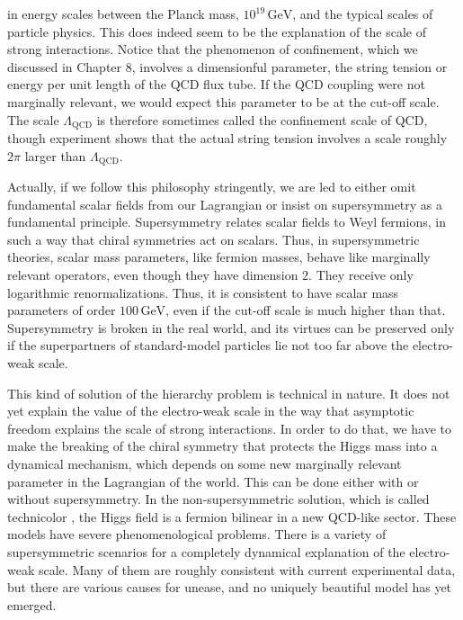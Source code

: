 in energy scales between the Planck mass, $10^{19}\,\mathrm{GeV}$, and the
typical scales of particle physics. This does indeed seem to be the explanation
of the scale of strong interactions. Notice that the phenomenon of confinement,
which we discussed in Chapter 8, involves a dimensionful parameter, the string
tension or energy per unit length of the QCD flux tube. If the QCD coupling
were not marginally relevant, we would expect this parameter to be at the
cut-off scale. The scale $\Lambda_{\mathrm{QCD}}$ is therefore sometimes called
the confinement scale of QCD, though experiment shows that the actual string
tension involves a scale roughly $2\pi$ larger than $\Lambda_{\mathrm{QCD}}$.

Actually, if we follow this philosophy stringently, we are led to either omit
fundamental scalar fields from our Lagrangian or insist on supersymmetry as a
fundamental principle. Supersymmetry relates scalar fields to Weyl fermions, in
such a way that chiral symmetries act on scalars. Thus, in supersymmetric
theories, scalar mass parameters, like fermion masses, behave like marginally
relevant operators, even though they have dimension $2$. They receive only
logarithmic renormalizations. Thus, it is consistent to have scalar mass
parameters of order $100\,\mathrm{GeV}$, even if the cut-off scale is much
higher than that. Supersymmetry is broken in the real world, and its virtues can
be preserved only if the superpartners of standard-model particles lie not too
far above the electro-weak scale.

This kind of solution of the hierarchy problem is technical in nature. It does
not yet explain the value of the electro-weak scale in the way that asymptotic
freedom explains the scale of strong interactions. In order to do that, we have
to make the breaking of the chiral symmetry that protects the Higgs mass into a
dynamical mechanism, which depends on some new marginally relevant parameter in
the Lagrangian of the world. This can be done either with or without
supersymmetry. In the non-supersymmetric solution, which is called technicolor
\cite{banks-ref-123}, the Higgs field is a fermion bilinear in a new QCD-like
sector. These models have severe phenomenological problems. There is a variety
of supersymmetric scenarios for a completely dynamical explanation of the
electro-weak scale. Many of them are roughly consistent with current
experimental data, but there are various causes for unease, and no uniquely
beautiful model has yet emerged.
